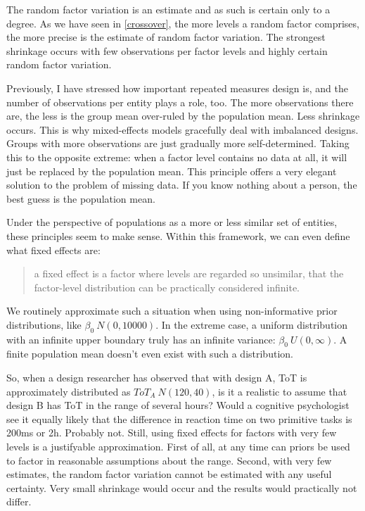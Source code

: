 \documentclass[]{svmono}
\theoremstyle{definition}
\theoremstyle{definition}
\theoremstyle{definition}
\theoremstyle{remark}
\begin{document}
The random factor variation is an estimate and as such is certain only
to a degree. As we have seen in \ref{crossover}, the more levels a
random factor comprises, the more precise is the estimate of random
factor variation. The strongest shrinkage occurs with few observations
per factor levels and highly certain random factor variation.

Previously, I have stressed how important repeated measures design is,
and the number of observations per entity plays a role, too. The more
observations there are, the less is the group mean over-ruled by the
population mean. Less shrinkage occurs. This is why mixed-effects models
gracefully deal with imbalanced designs. Groups with more observations
are just gradually more self-determined. Taking this to the opposite
extreme: when a factor level contains no data at all, it will just be
replaced by the population mean. This principle offers a very elegant
solution to the problem of missing data. If you know nothing about a
person, the best guess is the population mean.

Under the perspective of populations as a more or less similar set of
entities, these principles seem to make sense. Within this framework, we
can even define what fixed effects are:

\begin{quote}
a fixed effect is a factor where levels are regarded so unsimilar, that
the factor-level distribution can be practically considered infinite.
\end{quote}

We routinely approximate such a situation when using non-informative
prior distributions, like \(\beta_0 ~ N(0, 10000)\). In the extreme
case, a uniform distribution with an infinite upper boundary truly has
an infinite variance: \(\beta_0 ~ U(0, \infty)\). A finite population
mean doesn't even exist with such a distribution.

So, when a design researcher has observed that with design A, ToT is
approximately distributed as \(ToT_A ~ N(120, 40)\), is it a realistic
to assume that design B has ToT in the range of several hours? Would a
cognitive psychologist see it equally likely that the difference in
reaction time on two primitive tasks is 200ms or 2h. Probably not.
Still, using fixed effects for factors with very few levels is a
justifyable approximation. First of all, at any time can priors be used
to factor in reasonable assumptions about the range. Second, with very
few estimates, the random factor variation cannot be estimated with any
useful certainty. Very small shrinkage would occur and the results would
practically not differ.
\end{document}
